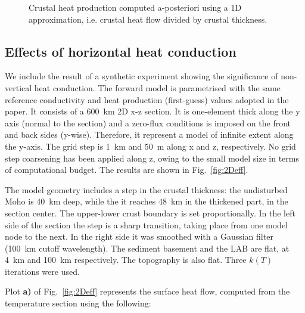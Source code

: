 {\begin{subappendices}
\begin{figure}
	\begin{adjustbox}{center}
	\end{adjustbox}
	\caption{Crustal heat production computed a-posteriori using a 1D approximation, i.e. crustal heat flow divided by crustal thickness.}
	\label{fig:AITN_A1D}
\end{figure}

\FloatBarrier

\subsection{Effects of horizontal heat conduction}
\label{ss:ApplSup:MethodTests:HorQ}

We include the result of a synthetic experiment showing the significance of non-vertical heat conduction.
The forward model is parametrised with the same reference conductivity and heat production (first-guess) values adopted in the paper.
It consists of a 600~km 2D x-z section.
It is one-element thick along the y axis (normal to the section) and a zero-flux conditions is imposed on the front and back sides (y-wise).
Therefore, it represent a model of infinite extent along the y-axis.
The grid step is 1~km and 50~m along x and z, respectively.
No grid step coarsening has been applied along z, owing to the small model size in terms of computational budget.
The results are shown in Fig.~\ref{fig:2Deff}.

The model geometry includes a step in the crustal thickness: the undisturbed Moho is 40~km deep, while the it reaches 48~km in the thickened part, in the section center.
The upper-lower crust boundary is set proportionally.
In the left side of the section the step is a sharp transition, taking place from one model node to the next.
In the right side it was smoothed with a Gaussian filter (100~km cutoff wavelength).
The sediment basement and the LAB are flat, at 4~km and 100~km respectively.
The topography is also flat.
Three $k(T)$ iterations were used.

Plot \textbf{a)} of Fig.~\ref{fig:2Deff} represents the surface heat flow, computed from the temperature section using the following:


\end{subappendices}}
